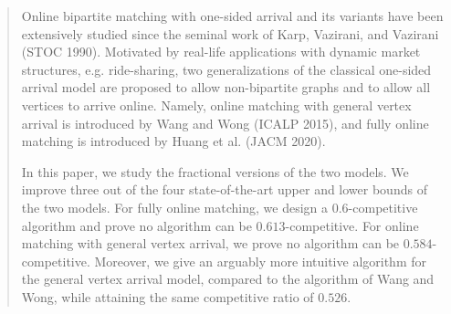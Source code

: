 \begin{abstract}
Online bipartite matching with one-sided arrival and its variants have been extensively studied since the seminal work of Karp, Vazirani, and Vazirani (STOC 1990). 
Motivated by real-life applications with dynamic market structures, e.g. ride-sharing, two generalizations of the classical one-sided arrival model are proposed to allow non-bipartite graphs and to allow all vertices to arrive online. Namely, online matching with general vertex arrival is introduced by Wang and Wong (ICALP 2015), and fully online matching is introduced by Huang et al. (JACM 2020).

In this paper, we study the fractional versions of the two models.  
We improve three out of the four state-of-the-art upper and lower bounds of the two models. For fully online matching, we design a $0.6$-competitive algorithm and prove no algorithm can be $0.613$-competitive. For online matching with general vertex arrival, we prove no algorithm can be $0.584$-competitive.
Moreover, we give an arguably more intuitive algorithm for the general vertex arrival model, compared to the algorithm of Wang and Wong, while attaining the same competitive ratio of $0.526$. 
\end{abstract}
